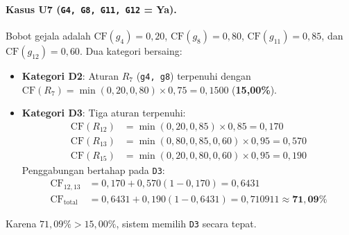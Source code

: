\documentclass[12pt,a4paper]{report}
\begin{document}
\paragraph{Kasus U7 (\texttt{G4, G8, G11, G12} = Ya).}
Bobot gejala adalah $\text{CF}(g_4)=0{,}20$, $\text{CF}(g_8)=0{,}80$, $\text{CF}(g_{11})=0{,}85$, dan $\text{CF}(g_{12})=0{,}60$. Dua kategori bersaing:
\begin{itemize}
  \item \textbf{Kategori D2}: Aturan $R_7$ (\texttt{g4, g8}) terpenuhi dengan $\text{CF}(R_7) = \min(0{,}20, 0{,}80) \times 0{,}75 = 0{,}1500$ (\textbf{15,00\%}).
  \item \textbf{Kategori D3}: Tiga aturan terpenuhi:
  \begin{align*}
    \text{CF}(R_{12}) &= \min(0{,}20, 0{,}85) \times 0{,}85 = 0{,}170 \\
    \text{CF}(R_{13}) &= \min(0{,}80, 0{,}85, 0{,}60) \times 0{,}95 = 0{,}570 \\
    \text{CF}(R_{15}) &= \min(0{,}20, 0{,}80, 0{,}60) \times 0{,}95 = 0{,}190
  \end{align*}
  Penggabungan bertahap pada \texttt{D3}:
  \begin{align*}
    \text{CF}_{12,13} &= 0{,}170 + 0{,}570(1 - 0{,}170) = 0{,}6431 \\
    \text{CF}_{\text{total}} &= 0{,}6431 + 0{,}190(1 - 0{,}6431) = 0{,}710911 \approx \mathbf{71{,}09\%}
  \end{align*}
\end{itemize}
Karena $71{,}09\% > 15{,}00\%$, sistem memilih \texttt{D3} secara tepat.
\end{document}
